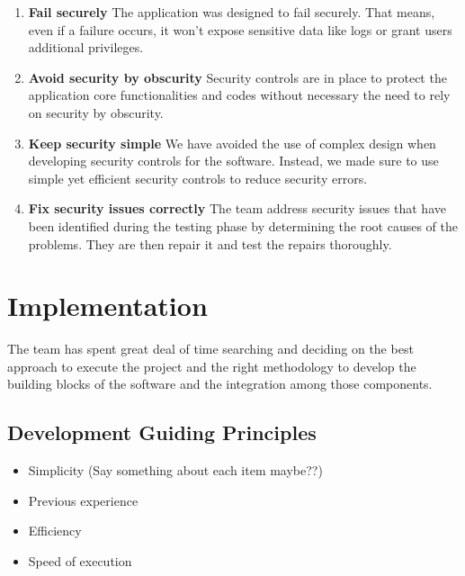 \documentclass{article}
\begin{document}
\begin{enumerate}
\item \textbf{Fail securely}
The application was designed to fail securely. That means, even if a failure occurs, it won’t expose sensitive data like logs or grant users additional privileges.
\item \textbf{Avoid security by obscurity}
Security controls are in place to protect the application core functionalities and codes without necessary the need to rely on security by obscurity.
\item \textbf{Keep security simple}
We have avoided the use of complex design when developing security controls for the software. Instead, we made sure to use simple yet efficient security controls to reduce security errors.
\item \textbf{Fix security issues correctly}
The team address security issues that have been identified during the testing phase by determining the root causes of the problems. They are then repair it and test the repairs thoroughly.
\end{enumerate}

\section{Implementation}
The team has spent great deal of time searching and deciding on the best approach to execute the project and the right methodology to develop the building blocks of the software and the integration among those components.

\subsection{Development Guiding Principles}

\begin{itemize}
  \item Simplicity (Say something about each item maybe??)
  \item Previous experience
  \item Efficiency
  \item Speed of execution
\end{itemize}
\end{document}
